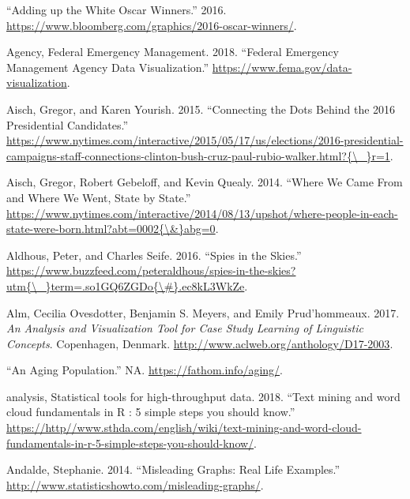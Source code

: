 \documentclass[]{book}
\begin{document}
\hypertarget{ref-adding_oscars}{}
``Adding up the White Oscar Winners.'' 2016.
\url{https://www.bloomberg.com/graphics/2016-oscar-winners/}.

\hypertarget{ref-fema_viz}{}
Agency, Federal Emergency Management. 2018. ``Federal Emergency
Management Agency Data Visualization.''
\url{https://www.fema.gov/data-visualization}.

\hypertarget{ref-campaign_staff}{}
Aisch, Gregor, and Karen Yourish. 2015. ``Connecting the Dots Behind the
2016 Presidential Candidates.''
\href{https://www.nytimes.com/interactive/2015/05/17/us/elections/2016-presidential-campaigns-staff-connections-clinton-bush-cruz-paul-rubio-walker.html?\%7B/_\%7Dr=1}{https://www.nytimes.com/interactive/2015/05/17/us/elections/2016-presidential-campaigns-staff-connections-clinton-bush-cruz-paul-rubio-walker.html?\{\textbackslash{}\_\}r=1}.

\hypertarget{ref-migration}{}
Aisch, Gregor, Robert Gebeloff, and Kevin Quealy. 2014. ``Where We Came
From and Where We Went, State by State.''
\href{https://www.nytimes.com/interactive/2014/08/13/upshot/where-people-in-each-state-were-born.html?abt=0002\%7B/\&\%7Dabg=0}{https://www.nytimes.com/interactive/2014/08/13/upshot/where-people-in-each-state-were-born.html?abt=0002\{\textbackslash{}\&\}abg=0}.

\hypertarget{ref-spies_sky}{}
Aldhous, Peter, and Charles Seife. 2016. ``Spies in the Skies.''
\href{https://www.buzzfeed.com/peteraldhous/spies-in-the-skies?utm\%7B/_\%7Dterm=.so1GQ6ZGDo\%7B/\#\%7D.ec8kL3WkZe}{https://www.buzzfeed.com/peteraldhous/spies-in-the-skies?utm\{\textbackslash{}\_\}term=.so1GQ6ZGDo\{\textbackslash{}\#\}.ec8kL3WkZe}.

\hypertarget{ref-lingui_data}{}
Alm, Cecilia Ovesdotter, Benjamin S. Meyers, and Emily Prud'hommeaux.
2017. \emph{An Analysis and Visualization Tool for Case Study Learning
of Linguistic Concepts}. Copenhagen, Denmark.
\url{http://www.aclweb.org/anthology/D17-2003}.

\hypertarget{ref-animated_pyramid}{}
``An Aging Population.'' NA. \url{https://fathom.info/aging/}.

\hypertarget{ref-r}{}
analysis, Statistical tools for high-throughput data. 2018. ``Text
mining and word cloud fundamentals in R : 5 simple steps you should
know.''
\url{https://http//www.sthda.com/english/wiki/text-mining-and-word-cloud-fundamentals-in-r-5-simple-steps-you-should-know/}.

\hypertarget{ref-andale_2014}{}
Andalde, Stephanie. 2014. ``Misleading Graphs: Real Life Examples.''
\url{http://www.statisticshowto.com/misleading-graphs/}.
\end{document}
